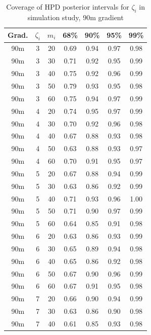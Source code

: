 
\begin{table}
\begin{center}
\caption{Coverage of HPD posterior intervals for $\zeta_i$ in simulation study, 90m gradient
\label{tab:sim_coverage_90m}}
\begin{tabular}{ccc|cccc}
 Grad. & $\zeta_i$ & $m_i$ & 68\% & 90\% & 95\% & 99\% \\ 
  \hline
90m &   3 &  20 & 0.69 & 0.94 & 0.97 & 0.98 \\ 
  90m &   3 &  30 & 0.71 & 0.92 & 0.95 & 0.99 \\ 
  90m &   3 &  40 & 0.75 & 0.92 & 0.96 & 0.99 \\ 
  90m &   3 &  50 & 0.79 & 0.93 & 0.95 & 0.98 \\ 
  90m &   3 &  60 & 0.75 & 0.94 & 0.97 & 0.99 \\ 
   \hline
90m &   4 &  20 & 0.74 & 0.95 & 0.97 & 0.99 \\ 
  90m &   4 &  30 & 0.70 & 0.92 & 0.96 & 0.98 \\ 
  90m &   4 &  40 & 0.67 & 0.88 & 0.93 & 0.98 \\ 
  90m &   4 &  50 & 0.63 & 0.88 & 0.93 & 0.97 \\ 
  90m &   4 &  60 & 0.70 & 0.91 & 0.95 & 0.97 \\ 
   \hline
90m &   5 &  20 & 0.67 & 0.88 & 0.94 & 0.99 \\ 
  90m &   5 &  30 & 0.63 & 0.86 & 0.92 & 0.99 \\ 
  90m &   5 &  40 & 0.71 & 0.93 & 0.96 & 1.00 \\ 
  90m &   5 &  50 & 0.71 & 0.90 & 0.97 & 0.99 \\ 
  90m &   5 &  60 & 0.64 & 0.85 & 0.91 & 0.98 \\ 
   \hline
90m &   6 &  20 & 0.63 & 0.86 & 0.93 & 0.99 \\ 
  90m &   6 &  30 & 0.65 & 0.89 & 0.94 & 0.98 \\ 
  90m &   6 &  40 & 0.65 & 0.86 & 0.92 & 0.98 \\ 
  90m &   6 &  50 & 0.67 & 0.90 & 0.96 & 0.99 \\ 
  90m &   6 &  60 & 0.67 & 0.91 & 0.95 & 0.98 \\ 
   \hline
90m &   7 &  20 & 0.66 & 0.90 & 0.94 & 0.99 \\ 
  90m &   7 &  30 & 0.63 & 0.86 & 0.90 & 0.98 \\ 
  90m &   7 &  40 & 0.61 & 0.85 & 0.93 & 0.98 \\ 

\end{tabular}
\end{center}
\end{table}
